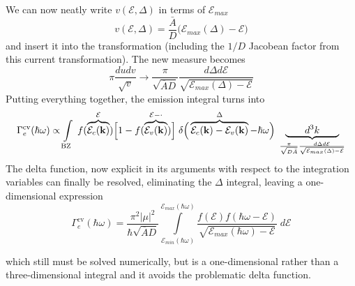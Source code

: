 We can now neatly write $v(\mathcal{E}, \Delta)$ in terms of $\mathcal{E}_{max}$
\begin{equation}
v(\mathcal{E}, \Delta) = \frac{\bar{A}}{D}\Big(\mathcal{E}_{max}(\Delta)-\mathcal{E}\Big)
\label{eq:quadratic_interband_v_expression}
\end{equation}
and insert it into the transformation (including the $1/D$ Jacobean factor from this current transformation). The new measure becomes
\begin{equation}
\pi \frac{dudv}{\sqrt{ v }} \to \frac{\pi}{\sqrt{ \overline{A}D }} \frac{d\Delta d\mathcal{E}}{\sqrt{ \mathcal{E}_{max}(\Delta)-\mathcal{E} }}
\label{eq:quadratic_interband_jacobian_transform}
\end{equation}
Putting everything together, the emission integral turns into
\begin{equation}
\Gamma_{e}^{\text{cv}}(\hbar\omega) \propto\int\limits_{\text{BZ}}  \; f(\overbrace{ \mathcal{E}_{c}(\mathbf{k}) }^{ \mathcal{E} }) \Big[1-f(\overbrace{ \mathcal{E}_{v}(\mathbf{k}) }^{\mathcal{E-\Delta}})\Big] \; \delta\Big(\overbrace{ \mathcal{E}_{c}(\mathbf{k}) - \mathcal{E}_{v}(\mathbf{k}) }^{ \Delta } - \hbar\omega  \Big) \; \underbrace{ \quad\quad d^{3}k \quad\quad }_{\Large \frac{\pi}{\sqrt{ D \bar{A} }}  \frac{d\Delta d\mathcal{E}}{ \sqrt{ \mathcal{E}_{max}(\Delta)-\mathcal{E} }} }
\label{eq:quadratic_interband_overbrace}
\end{equation}
The delta function, now explicit in its arguments with respect to the integration variables can finally be resolved, eliminating the $\Delta$ integral, leaving a one-dimensional expression
\begin{equation}
\boxed{\Gamma_{e}^{\text{cv}}(\hbar\omega) =\frac{\pi^{2}|\mu|^{2}}{\hbar \sqrt{ \overline{A}D }}
\int\limits_{\mathcal{E}_{min}(\hbar \omega)}^{\mathcal{E}_{max}(\hbar \omega)} \frac{{f(\mathcal{E})f(\hbar\omega-\mathcal{E})}}{\sqrt{ \mathcal{E}_{max}(\hbar\omega)-\mathcal{E} }} \; d\mathcal{E}}
\label{eq:quadratic_interband_final_form}
\end{equation}

which still must be solved numerically, but is a one-dimensional rather than a three-dimensional integral and it avoids the problematic delta function.
